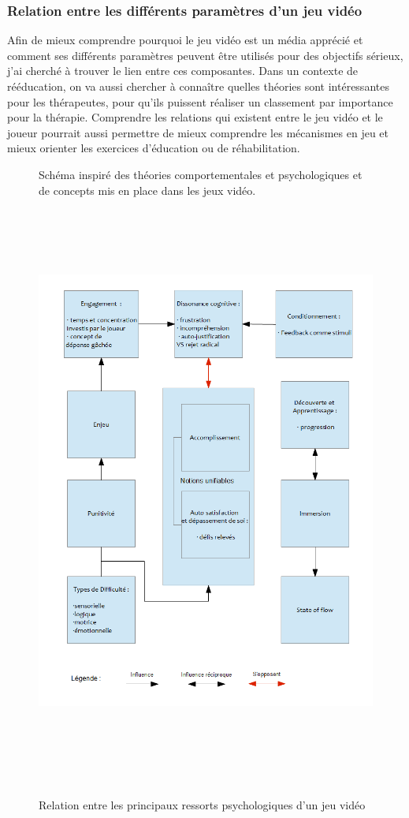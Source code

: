 	\subsubsection*{Relation entre les différents paramètres d'un jeu vidéo}
Afin de mieux comprendre pourquoi le jeu vidéo est un média apprécié et comment ses différents paramètres peuvent être utilisés pour des objectifs sérieux, j'ai cherché à trouver le lien entre ces composantes. Dans un contexte de rééducation, on va aussi chercher à connaître quelles théories sont intéressantes pour les thérapeutes, pour qu'ils puissent réaliser un classement par importance pour la thérapie. Comprendre les relations qui existent entre le jeu vidéo et le joueur pourrait aussi permettre de mieux comprendre les mécanismes en jeu et mieux orienter les exercices d'éducation ou de réhabilitation.
\begin{figure}[htbp]
Schéma inspiré des théories comportementales et psychologiques et de concepts mis en place dans les jeux vidéo.
	\centering
	\includegraphics[height=19.6cm]{images/lien_theories}
	\caption{Relation entre les principaux ressorts psychologiques d'un jeu vidéo}
	\label{lien_theories}
\end{figure}			

